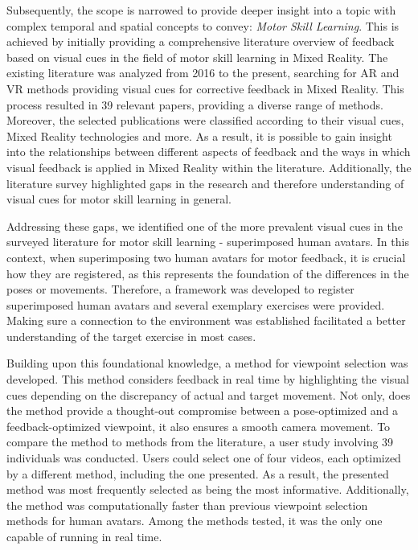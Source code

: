 Subsequently, the scope is narrowed to provide deeper insight into a topic with complex temporal and spatial concepts to convey: \emph{Motor Skill Learning}.
This is achieved by initially providing a comprehensive literature overview of feedback based on visual cues in the field of motor skill learning in Mixed Reality.
The existing literature was analyzed from 2016 to the present, searching for AR and VR methods providing visual cues for corrective feedback in Mixed Reality.
This process resulted in 39 relevant papers, providing a diverse range of methods.
Moreover, the selected publications were classified according to their visual cues, Mixed Reality technologies and more.
As a result, it is possible to gain insight into the relationships between different aspects of feedback and the ways in which visual feedback is applied in Mixed Reality within the literature.
Additionally, the literature survey highlighted gaps in the research and therefore understanding of visual cues for motor skill learning in general.

Addressing these gaps, we identified one of the more prevalent visual cues in the surveyed literature for motor skill learning - superimposed human avatars.
In this context, when superimposing two human avatars for motor feedback, it is crucial how they are registered, as this represents the foundation of the differences in the poses or movements.
Therefore, a framework was developed to register superimposed human avatars and several exemplary exercises were provided.
Making sure a connection to the environment was established facilitated a better understanding of the target exercise in most cases.

Building upon this foundational knowledge, a method for viewpoint selection was developed.
This method considers feedback in real time by highlighting the visual cues depending on the discrepancy of actual and target movement.
Not only, does the method provide a thought-out compromise between a pose-optimized and a feedback-optimized viewpoint, it also ensures a smooth camera movement.
To compare the method to methods from the literature, a user study involving 39 individuals was conducted.
Users could select one of four videos, each optimized by a different method, including the one presented.
As a result, the presented method was most frequently selected as being the most informative.
Additionally, the method was computationally faster than previous viewpoint selection methods for human avatars.
Among the methods tested, it was the only one capable of running in real time.

